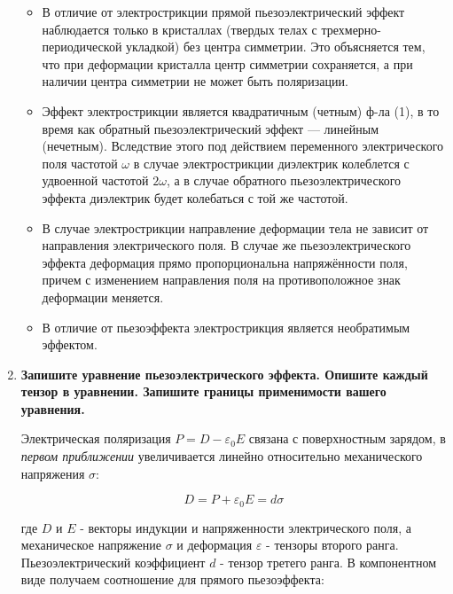 \documentclass[a4paper]{article}
\begin{document}
\begin{enumerate}
\begin{itemize}
        \item В отличие от электрострикции прямой пьезоэлектрический эффект наблюдается только в кристаллах (твердых телах с трехмерно-периодической укладкой)
        без центра симметрии. Это объясняется тем, что при деформации кристалла центр симметрии сохраняется, а при наличии центра симметрии не может быть поляризации.

        \item Эффект электрострикции является квадратичным (четным) ф-ла (1), в то время как обратный пьезоэлектрический эффект — линейным (нечетным).
        Вследствие этого под действием переменного электрического поля частотой $\omega$ в случае электрострикции диэлектрик колеблется с удвоенной частотой $2 \omega$, 
        а в случае обратного пьезоэлектрического эффекта диэлектрик будет колебаться с той же частотой.
        
        \item В случае электрострикции направление деформации тела не зависит от направления электрического поля. В случае же пьезоэлектрического эффекта деформация прямо пропорциональна 
        напряжённости поля, причем с изменением направления поля на противоположное знак деформации меняется. 

        \item В отличие от пьезоэффекта электрострикция является необратимым эффектом.


    \end{itemize}


    \item \textbf{Запишите уравнение пьезоэлектрического эффекта. Опишите каждый тензор в уравнении. Запишите границы применимости вашего уравнения.} \par 
    
    Электрическая поляризация $P = D - \varepsilon_0 E$ связана с поверхностным зарядом, в \textit{первом приближении} увеличивается линейно относительно механического напряжения $\sigma$:

    \begin{equation}
        D = P + \varepsilon_0 E = d \sigma
    \end{equation}

    где $D$ и $E$ - векторы индукции и напряженности электрического поля, а механическое напряжение $\sigma$ и деформация $\varepsilon$ - тензоры второго ранга. 
    Пьезоэлектрический коэффициент $d$ - тензор третего ранга. В компонентном виде получаем соотношение для прямого пьезоэффекта:


\end{enumerate}
\end{document}
